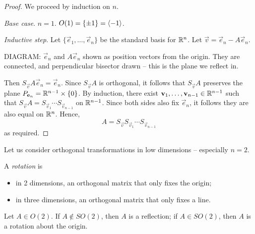 \documentclass{../template/note}
\begin{document}
    \begin{proof}
        We proceed by induction on \(n\).

        \emph{Base case}. \(n=1\). \(O(1) = \{\pm 1\} = \left \langle -1 \right \rangle\).

        \emph{Inductive step}. Let \(\{\vec e_1, \dots, \vec e_n\}\) be the standard basis for \(\mathbb R^n\). Let \(\vec v = \vec e_n - A \vec e_n\).

        DIAGRAM: \(\vec e_n\) and \(A \vec e_n\) shown as position vectors from the origin. They are connected, and perpendicular bisector drawn -- this is the plane we reflect in.

        Then \(S_{\vec v}A \vec e_n = \vec e_n\). Since \(S_{\vec v}A\) is orthogonal, it follows that \(S_{\vec v}A\) preserves the plane \(P_{\vec e_n} = \RR^{n-1} \times \{0\}\). By induction, there exist \(\vec v_1, \dots, \vec v_{n-1} \in \RR^{n-1}\) such that \(S_{\vec v}A = S_{\vec v_1} \cdots S_{\vec v_{n-1}}\) on \(\mathbb R^{n-1}\). Since both sides also fix \(\vec e_n\), it follows they are also equal on \(\mathbb R^n\). Hence,
        \[  
            A = S_{\vec v}S_{\vec v_1} \cdots S_{\vec v_{n-1}}
        \]
        as required.
    \end{proof}
    
    Let us consider orthogonal transformations in low dimensions -- especially \(n=2\).

    \begin{definition}[Rotations]
        A \emph{rotation} is
        \begin{itemize}
            \item in 2 dimensions, an orthogonal matrix that only fixes the origin;
            \item in three dimensions, an orthogonal matrix that only fixes a line.
        \end{itemize}
    \end{definition}
    
    

    \begin{lemma}[Elements of \(O(2)\)]
        Let \(A \in O(2)\). If \(A \notin SO(2)\), then \(A\) is a reflection; if \(A \in SO(2)\), then \(A\) is a rotation about the origin.
    \end{lemma}
    
\end{document}

